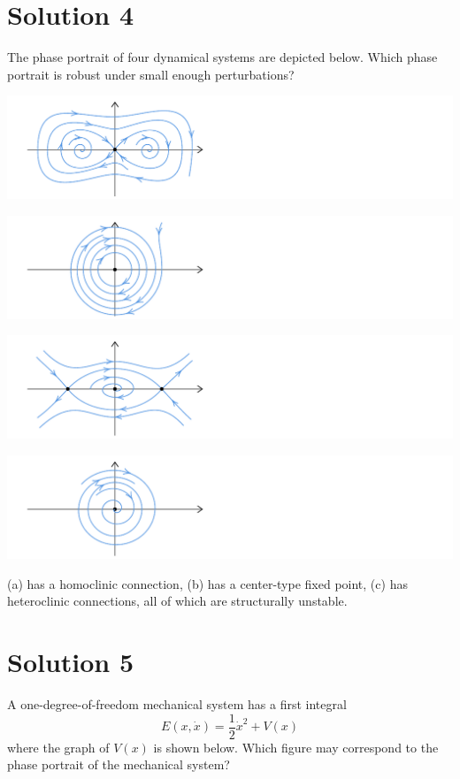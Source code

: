 \documentclass[twoside,10pt,a4paper]{article}
\begin{document}
\section*{Solution 4}
The phase portrait of four dynamical systems are depicted below. Which phase portrait is robust under small enough perturbations?

\begin{enumerate}[label=(\alph*)]
	\item \includegraphics[scale=0.8]{Graphics/MCQ1_figures/Q18D01.pdf}
	\item \includegraphics[scale=0.8]{Graphics/MCQ1_figures/Q18D02.pdf}
	\item \includegraphics[scale=0.8]{Graphics/MCQ1_figures/Q18D03.pdf}
	{\color{MyRed}\item \includegraphics[scale=0.8]{Graphics/MCQ1_figures/Q18D04.pdf}}
\end{enumerate}

{\color{MyRed} 
(a) has a homoclinic connection, (b) has a center-type fixed point, (c) has heteroclinic connections, all of which are structurally unstable.
}

\section*{Solution 5}
A one-degree-of-freedom mechanical system has a first integral
\begin{equation*}
	E(x, \dot{x}) = \frac{1}{2}\dot{x}^2 + V(x)
\end{equation*}
where the graph of $V(x)$ is shown below. Which figure may correspond to the phase portrait of the mechanical system?
\end{document}
